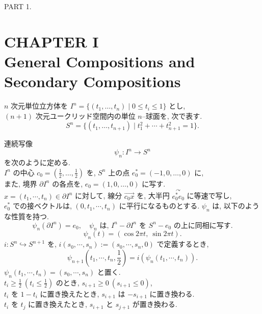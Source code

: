 \documentclass[12pt, leqno]{ltjsarticle}
\numberwithin{equation}{section}
\theoremstyle{plain}
\theoremstyle{definition}
\theoremstyle{remark}
\begin{document}
\begin{center}
  PART 1.
\end{center}

\setcounter{section}{1}

\section*{CHAPTER I\\ General Compositions and Secondary Compositions}

$n$ 次元単位立方体を
\(
I^n=\{(t_1,\ldots,t_n)\mid 0\le t_i\le 1\}
\)
とし, \\
$(n+1)$ 次元ユークリッド空間内の単位 $n$–球面を, 次で表す.
\[
S^n=\{(t_1,\ldots,t_{n+1})\mid t_1^2+\cdots+t_{n+1}^2=1\}.
\]

連続写像
\begin{equation}
\psi_n:I^n\longrightarrow S^n
\end{equation}
を次のように定める. \\
$I^n$ の中心 $c_0=(\tfrac12,\ldots,\tfrac12)$ を,
$S^n$ 上の点 $e_0^*=(-1,0,\ldots,0)$ に, \\
また, 境界 $\partial I^n$ の各点を, 
$e_0=(1,0,\ldots,0)$ に写す.\\
\(x=(t_1,\cdots,t_n)\in\partial I^{n}\)
に対して, 線分
\(\overrightarrow{c_{0}x}\)
を, 大半円
\(\stackrel{\curvearrowright}{e_{0}^{*}e_{0}}\)
に等速で写し,\\
\(e_{0}^{*}\)
での接ベクトルは,
\((0,t_{1},\cdots,t_{n})\)
に平行になるものとする.
\(\psi_n\) は, 以下のような性質を持つ.
\begin{equation}
  \psi_n(\partial I^n) = e_0,\quad
  \psi_n \text{ は, } I^n - \partial I^n \text{ を }
  S^n - e_0 \text{ の上に同相に写す.}
\end{equation}
\[
\psi_n(t) = (\cos 2\pi t,\ \sin 2\pi t).
\]
\(i:S^{n}\hookrightarrow S^{n+1}\)
を,
\(i(s_{0},\cdots,s_{n}) := (s_{0},\cdots,s_{n},0)\)
で定義するとき,
\[
\psi_{n+1}(t_{1},\cdots,t_{n},\frac{1}{2})=
i(\psi_{n}(t_{1},\cdots,t_{n})).
\]
\(\psi_{n}(t_{1},\cdots,t_{n})=(s_{0},\cdots,s_{n})\)
と置く.\\
\(t_{i}\geq\frac{1}{2}\ (t_{i}\leq\frac{1}{2})\)
のとき,
\(s_{i+1}\geq0\ (s_{i+1}\leq0)\),\\
\(t_{i}\)
を
\(1-t_{i}\)
に置き換えたとき,
\(s_{i+1}\)
は
\(-s_{i+1}\)
に置き換わる.\\
\(t_{i}\)
を
\(t_{j}\)
に置き換えたとき,
\(s_{i+1}\)
と
\(s_{j+1}\)
が置き換わる.
\end{document}
